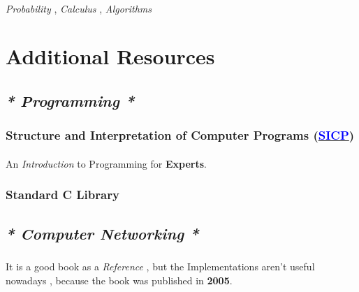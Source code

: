 \documentclass[12pt, a4paper]{article}
\begin{document}
\paragraph{}

\begin{large}
\begin{center}
	\emph{Probability} , \emph{Calculus} , \emph{Algorithms}
\end{center}	
\end{large}


\newpage
\section{Additional Resources}
\subsection*{\emph{* Programming *}}
\subsubsection*{Structure and Interpretation of Computer Programs (\href{https://mitpress.mit.edu/sites/default/files/sicp/index.html}{\textcolor{blue}{SICP}})}
\paragraph{}
An \emph{Introduction} to Programming for \textbf{Experts}.
\subsubsection*{Standard C Library}
\subsubsection*{}
\subsection*{\emph{* Computer Networking *}}
\subsubsection*{ }
\paragraph{}
It is a good book as a \emph{Reference} , but the Implementations aren't useful nowadays , because the book was published in \textbf{2005}.
\end{document}
